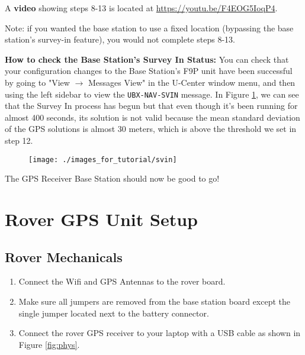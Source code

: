 \documentclass{article}%
\begin{document}
\begin{enumerate}
	\begin{myquote}
	A \textbf{video} showing steps 8-13 is located at \url{https://youtu.be/F4EOG5IoqP4}.
	\end{myquote}
			
	\begin{myquote}
	Note: if you wanted the base station to use a fixed location (bypassing the base station's survey-in feature), you would not complete steps 8-13.	
	\end{myquote}
	
	\begin{myquote}
	\textbf{How to check the Base Station's Survey In Status:} You can check that your configuration changes to the Base Station's F9P unit have been successful by going to "View $\rightarrow$ Messages View" in the U-Center window menu, and then using the left sidebar to view the \texttt{UBX-NAV-SVIN} message.  In Figure \ref{fig:svin}, we can see that the Survey In process has begun but that even though it's been running for almost 400 seconds, its solution is not valid because the mean standard deviation of the GPS solutions is almost 30 meters, which is above the threshold we set in step 12. 
	\end{myquote}

	\begin{figure}
		\centering
		\texttt{[image: ./images\_for\_tutorial/svin]}
		\label{fig:svin}
	\end{figure}
	
	\end{enumerate}
	The GPS Receiver Base Station should now be good to go!

\section{Rover GPS Unit Setup}
\subsection{Rover Mechanicals}
	\begin{enumerate}
		\item Connect the Wifi and GPS Antennas to the rover board.
		\item Make sure all jumpers are removed from the base station board except the single jumper located next to the battery connector.
		\item Connect the rover GPS receiver to your laptop with a USB cable as shown in Figure \ref{fig:phys}.
	\end{enumerate}
\end{document}
